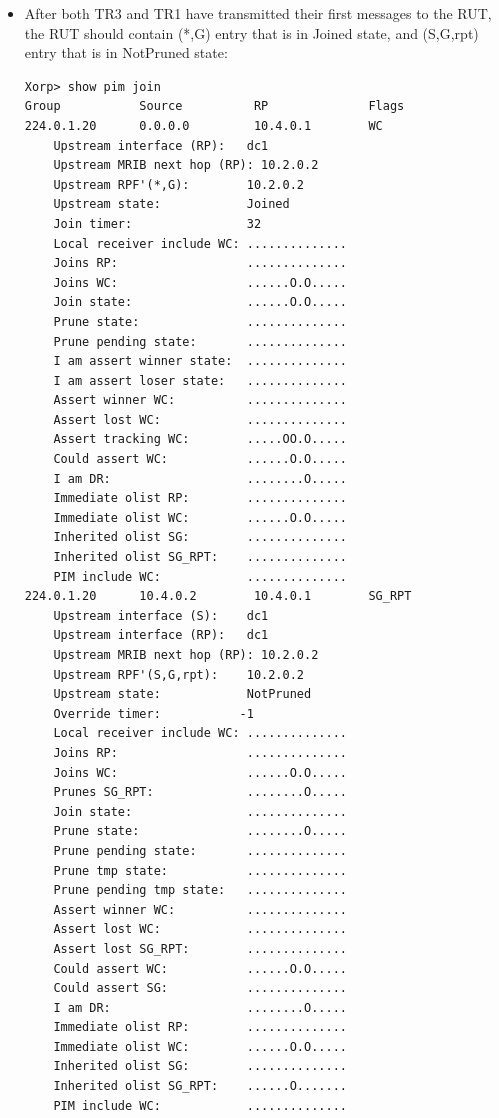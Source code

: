 \documentclass[11pt]{report}
\begin{document}
\begin{itemize}

  \item After both TR3 and TR1 have transmitted their first messages to the
  RUT, the RUT should contain (*,G) entry that is in Joined state, and
  (S,G,rpt) entry that is in NotPruned state:

\begin{verbatim}
Xorp> show pim join 
Group           Source          RP              Flags
224.0.1.20      0.0.0.0         10.4.0.1        WC   
    Upstream interface (RP):   dc1
    Upstream MRIB next hop (RP): 10.2.0.2
    Upstream RPF'(*,G):        10.2.0.2
    Upstream state:            Joined 
    Join timer:                32
    Local receiver include WC: ..............
    Joins RP:                  ..............
    Joins WC:                  ......O.O.....
    Join state:                ......O.O.....
    Prune state:               ..............
    Prune pending state:       ..............
    I am assert winner state:  ..............
    I am assert loser state:   ..............
    Assert winner WC:          ..............
    Assert lost WC:            ..............
    Assert tracking WC:        .....OO.O.....
    Could assert WC:           ......O.O.....
    I am DR:                   ........O.....
    Immediate olist RP:        ..............
    Immediate olist WC:        ......O.O.....
    Inherited olist SG:        ..............
    Inherited olist SG_RPT:    ..............
    PIM include WC:            ..............
224.0.1.20      10.4.0.2        10.4.0.1        SG_RPT 
    Upstream interface (S):    dc1
    Upstream interface (RP):   dc1
    Upstream MRIB next hop (RP): 10.2.0.2
    Upstream RPF'(S,G,rpt):    10.2.0.2
    Upstream state:            NotPruned 
    Override timer:           -1
    Local receiver include WC: ..............
    Joins RP:                  ..............
    Joins WC:                  ......O.O.....
    Prunes SG_RPT:             ........O.....
    Join state:                ..............
    Prune state:               ........O.....
    Prune pending state:       ..............
    Prune tmp state:           ..............
    Prune pending tmp state:   ..............
    Assert winner WC:          ..............
    Assert lost WC:            ..............
    Assert lost SG_RPT:        ..............
    Could assert WC:           ......O.O.....
    Could assert SG:           ..............
    I am DR:                   ........O.....
    Immediate olist RP:        ..............
    Immediate olist WC:        ......O.O.....
    Inherited olist SG:        ..............
    Inherited olist SG_RPT:    ......O.......
    PIM include WC:            ..............
\end{verbatim}


\end{itemize}
\end{document}
